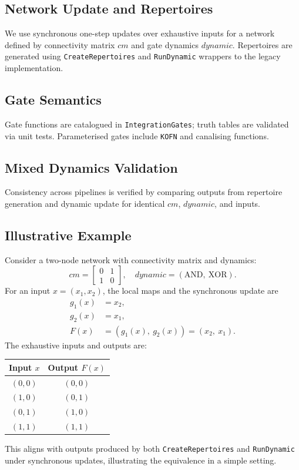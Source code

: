 \documentclass{article}
\begin{document}
\subsection{Network Update and Repertoires}
We use synchronous one-step updates over exhaustive inputs for a network defined by connectivity matrix \(cm\) and gate dynamics \(dynamic\). Repertoires are generated using \texttt{CreateRepertoires} and \texttt{RunDynamic} wrappers to the legacy implementation.
\subsection{Gate Semantics}
Gate functions are catalogued in \texttt{Integration\textasciigrave Gates}; truth tables are validated via unit tests. Parameterised gates include \texttt{KOFN} and canalising functions.
\subsection{Mixed Dynamics Validation}
Consistency across pipelines is verified by comparing outputs from repertoire generation and dynamic update for identical \(cm\), \(dynamic\), and inputs.
\subsection{Illustrative Example}
Consider a two-node network with connectivity matrix and dynamics:
\[
cm = \begin{bmatrix}0 & 1\\ 1 & 0\end{bmatrix},\quad dynamic = (\text{AND},\ \text{XOR}).
\]
For an input \(x=(x_1,x_2)\), the local maps and the synchronous update are
\begin{align*}
g_1(x) &= x_2,\\
g_2(x) &= x_1,\\
F(x) &= (g_1(x),\ g_2(x)) = (x_2,\ x_1).
\end{align*}
The exhaustive inputs and outputs are:
\begin{center}
\begin{tabular}{cc}
\toprule
\textbf{Input} $x$ & \textbf{Output} $F(x)$ \\
\midrule
$(0,0)$ & $(0,0)$ \\
$(1,0)$ & $(0,1)$ \\
$(0,1)$ & $(1,0)$ \\
$(1,1)$ & $(1,1)$ \\
\bottomrule
\end{tabular}
\end{center}
This aligns with outputs produced by both \texttt{CreateRepertoires} and \texttt{RunDynamic} under synchronous updates, illustrating the equivalence in a simple setting.
\end{document}
